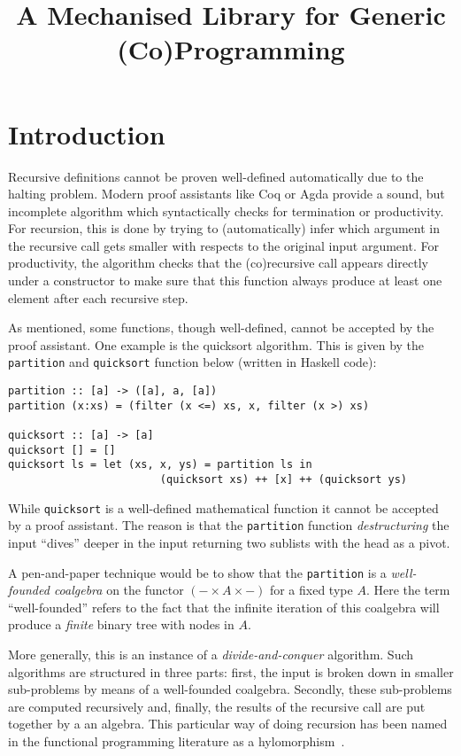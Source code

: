 \documentclass{article}
\title{A Mechanised Library for Generic (Co)Programming}
\author{}
\newcommand{\haskell}[1]{\texttt{#1}}
\begin{document}
\maketitle
\section{Introduction}
Recursive definitions cannot be proven well-defined automatically due to the
halting problem. Modern proof assistants like Coq or Agda provide a sound, but
incomplete algorithm which syntactically checks for termination or productivity.
For recursion, this is done by trying to (automatically) infer which argument in
the recursive call gets smaller with respects to the original input argument.
For productivity, the algorithm checks that the (co)recursive call appears
directly under a constructor to make sure that this function always produce at
least one element after each recursive step.

As mentioned, some functions, though well-defined, cannot be accepted by the
proof assistant. One example is the quicksort algorithm. This is given by the
\haskell{partition} and \haskell{quicksort} function below (written in Haskell
code):
\begin{verbatim}
partition :: [a] -> ([a], a, [a])
partition (x:xs) = (filter (x <=) xs, x, filter (x >) xs)

quicksort :: [a] -> [a]
quicksort [] = []
quicksort ls = let (xs, x, ys) = partition ls in
                        (quicksort xs) ++ [x] ++ (quicksort ys)
\end{verbatim}
While \haskell{quicksort} is a well-defined mathematical function it cannot be
accepted by a proof assistant.  The reason is that the \haskell{partition}
function \emph{destructuring} the input ``dives'' deeper in the input returning
two sublists with the head as a pivot.

A pen-and-paper technique would be to show that the \haskell{partition} is a
\emph{well-founded coalgebra} on the functor $(- \times A \times -)$ for a fixed
type $A$. Here the term ``well-founded'' refers to the fact that the infinite
iteration of this coalgebra will produce a \emph{finite} binary tree with nodes
in $A$.

More generally, this is an instance of a \emph{divide-and-conquer} algorithm.
Such algorithms are structured in three parts: first, the input is broken down
in smaller sub-problems by means of a well-founded coalgebra. Secondly, these
sub-problems are computed recursively and, finally, the results of the recursive
call are put together by a an algebra. This particular way of doing recursion
has been named in the functional programming literature as a
hylomorphism~\cite{MeijerFP91, HuIT96}.
\end{document}
